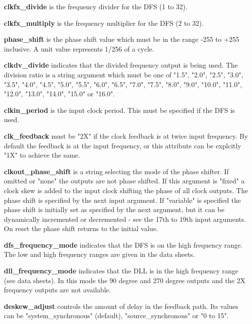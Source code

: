                 {\bf clkfx\_divide} is the frequency divider for the DFS (1 to 32).

                {\bf clkfx\_multiply} is the frequency multiplier for the DFS (2 to 32).


                {\bf phase\_shift} is the phase shift value which must be in the
                range -255 to +255 inclusive. A unit value represents 1/256 of a cycle.

                {\bf clkdv\_divide} indicates that the divided
                frequency output is being used. The division ratio is a
                string argument which must be one of "1.5", "2.0", "2.5", "3.0",
                "3.5", "4.0", "4.5", "5.0", "5.5", "6.0", "6.5", "7.0", "7.5", "8.0",
                "9.0", "10.0", "11.0", "12.0", "13.0", "14.0", "15.0" or "16.0".

                {\bf clkin\_period} is the input clock period. This must be
                specified if the DFS is used.

                {\bf clk\_feedback} must be "2X" if the clock feedback is at twice
                input frequency. By default the feedback is at the input frequency, or
                this attribute can be explcitly "1X" to achieve the same.

                {\bf clkout\_phase\_shift} is a string selecting the mode of the
                phase shifter. If omitted or "none" the outputs are not phase shifted.
                If this argument is "fixed" a clock skew is added to the input clock
                shifting the phase of all clock outputs. The phase shift is specified by
                the next input argument. If "variable" is specified the phase shift
                is initially set as specified by the next argument, but it can be
                dynamically incremented or decremented - see the 17th to 19th input
                arguments. On reset the phase shift returns to the initial value.

                {\bf dfs\_frequency\_mode} indicates that the DFS is on
                the high frequency range. The low and high frequency ranges are
                given in the data sheets.

                {\bf dll\_frequency\_mode} indicates that the DLL is in
                the high frequency range (see data sheets). In this mode the 90 degree
                and 270 degree outputs and the 2X frequency outputs  are not available.

                {\bf deskew\_adjust} controls the amount of delay in the feedback
                path. Its values can be "system\_synchronous" (default),
                "source\_synchronous" or "0 to 15".


